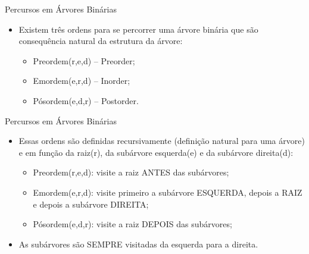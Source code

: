 \documentclass[12pt,table,xcolor={dvipsnames}]{beamer}
\begin{document}
\begin{frame}[fragile]{Percursos em Árvores Binárias}
          \begin{itemize}
          \item Existem três ordens para se percorrer uma árvore binária que são consequência natural da estrutura da árvore:
          \begin{itemize}
          \item Preordem(r,e,d) – Preorder;
          \item Emordem(e,r,d) – Inorder;
          \item Pósordem(e,d,r) – Postorder.
          \end{itemize}
       	  \end{itemize}
\end{frame}

\begin{frame}[fragile]{Percursos em Árvores Binárias}
          \begin{itemize}
          \item Essas ordens são definidas recursivamente (definição natural para uma árvore) e em função da raiz(r), da subárvore esquerda(e) e da subárvore direita(d):
          \begin{itemize}
          \item Preordem(r,e,d): visite a raiz ANTES das subárvores;
          \item Emordem(e,r,d): visite primeiro a subárvore ESQUERDA, depois a RAIZ e depois a subárvore DIREITA;
          \item Pósordem(e,d,r): visite a raiz DEPOIS das subárvores;
          \end{itemize}
          \item As subárvores são SEMPRE visitadas da esquerda para a direita.
       	  \end{itemize}
\end{frame}
\end{document}
